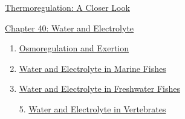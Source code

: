 \documentclass[12pt,letterpaper]{article}
\newcommand{\thetitle}{\hypertarget{home}{How Animals Work}}
\begin{document}
\hypertarget{39.5}{}
\begin{secbox}{\hyperlink{39}{Thermoregulation: A Closer Look}}{

}\end{secbox}
\clearpage

\renewcommand{\thetitle}{\hypertarget{40}{Water and Electrolye Balance}}
\hypertarget{40}{}
\setcounter{section}{40}

\begin{chapbox}{\hyperlink{home}{Chapter 40: Water and Electrolyte}}
    \begin{enumerate}
        \item \hyperlink{40.1}{Osmoregulation and Exertion}
        \item \hyperlink{40.2}{Water and Electrolyte in Marine Fishes}
        \item \hyperlink{40.3}{Water and Electrolyte in Freshwater Fishes}
        \item [5.] \hyperlink{40.5}{Water and Electrolyte in Vertebrates}
    \end{enumerate}
\end{chapbox}
\end{document}
